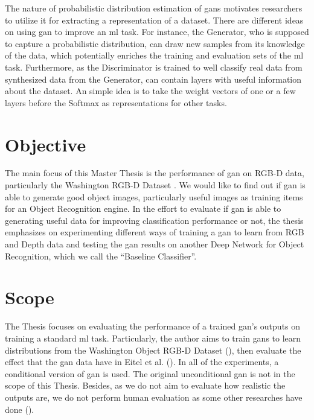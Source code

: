 The nature of probabilistic distribution estimation of \acrshort{gan}s motivates
researchers to utilize it for extracting a representation of a dataset. There are
different ideas on using \acrshort{gan} to improve an \acrshort{ml} task. For instance,
the Generator, who is supposed to capture a probabilistic distribution, can draw new
samples from its knowledge of the data, which potentially enriches the training and
evaluation sets of the \acrshort{ml} task. Furthermore, as the Discriminator is trained to
well classify real data from synthesized data from the Generator, can contain layers with
useful information about the dataset. An simple idea is to take the weight vectors of one
or a few layers before the Softmax as representations for other tasks.

\section{Objective\label{sec:objective}}
The main focus of this Master Thesis is the performance of \acrfull{gan} on RGB-D data,
particularly the Washington RGB-D Dataset . We would like to
find out if \acrshort{gan} is able to generate good object images, particularly useful
images as training items for an Object Recognition engine. In the effort to evaluate if
\acrshort{gan} is able to generating useful data for improving classification performance
or not, the thesis emphasizes on experimenting different ways of training a \acrshort{gan}
to learn from RGB and Depth data and testing the \acrshort{gan} results on another Deep
Network for Object Recognition, which we call the ``Baseline Classifier''.

\section{Scope\label{sec:scope}}
The Thesis focuses on evaluating the performance of a trained \acrshort{gan}'s outputs on
training a standard \acrshort{ml} task. Particularly, the author aims to train
\acrshort{gan}s to learn distributions from the Washington Object RGB-D Dataset
(), then evaluate the effect that the \acrshort{gan} data
have in Eitel et al. (). In all of the experiments, a conditional version
of \acrshort{gan} is used. The original unconditional \acrshort{gan} is not in the scope
of this Thesis. Besides, as we do not aim to evaluate how realistic the outputs are, we do
not perform human evaluation as some other researches have done (). 

